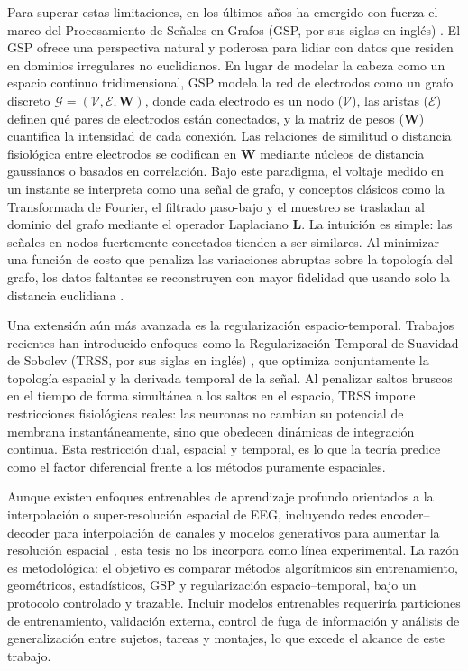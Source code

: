 Para superar estas limitaciones, en los últimos años ha emergido con fuerza el marco del Procesamiento de Señales en Grafos (GSP, por sus siglas en inglés) \cite{shuman2013,ortega2018}. El GSP ofrece una perspectiva natural y poderosa para lidiar con datos que residen en dominios irregulares no euclidianos. En lugar de modelar la cabeza como un espacio continuo tridimensional, GSP modela la red de electrodos como un grafo discreto $\mathcal{G} = (\mathcal{V}, \mathcal{E}, \mathbf{W})$, donde cada electrodo es un nodo ($\mathcal{V}$), las aristas ($\mathcal{E}$) definen qué pares de electrodos están conectados, y la matriz de pesos ($\mathbf{W}$) cuantifica la intensidad de cada conexión. Las relaciones de similitud o distancia fisiológica entre electrodos se codifican en $\mathbf{W}$ mediante núcleos de distancia gaussianos o basados en correlación.
Bajo este paradigma, el voltaje medido en un instante se interpreta como una señal de grafo, y conceptos clásicos como la Transformada de Fourier, el filtrado paso-bajo y el muestreo se trasladan al dominio del grafo mediante el operador Laplaciano $\mathbf{L}$. La intuición es simple: las señales en nodos fuertemente conectados tienden a ser similares. Al minimizar una función de costo que penaliza las variaciones abruptas sobre la topología del grafo, los datos faltantes se reconstruyen con mayor fidelidad que usando solo la distancia euclidiana \cite{narang2013}.

Una extensión aún más avanzada es la regularización espacio-temporal. Trabajos recientes han introducido enfoques como la Regularización Temporal de Suavidad de Sobolev (TRSS, por sus siglas en inglés) \cite{giraldo2022}, que optimiza conjuntamente la topología espacial y la derivada temporal de la señal. Al penalizar saltos bruscos en el tiempo de forma simultánea a los saltos en el espacio, TRSS impone restricciones fisiológicas reales: las neuronas no cambian su potencial de membrana instantáneamente, sino que obedecen dinámicas de integración continua. Esta restricción dual, espacial y temporal, es lo que la teoría predice como el factor diferencial frente a los métodos puramente espaciales.

Aunque existen enfoques entrenables de aprendizaje profundo orientados a la interpolación o super-resolución espacial de EEG, incluyendo redes encoder--decoder para interpolación de canales y modelos generativos para aumentar la resolución espacial \cite{sabaSadiya2020eeg_channel_interpolation,corley2018deep_eeg_super_resolution}, esta tesis no los incorpora como línea experimental. La razón es metodológica: el objetivo es comparar métodos algorítmicos sin entrenamiento, geométricos, estadísticos, GSP y regularización espacio--temporal, bajo un protocolo controlado y trazable. Incluir modelos entrenables requeriría particiones de entrenamiento, validación externa, control de fuga de información y análisis de generalización entre sujetos, tareas y montajes, lo que excede el alcance de este trabajo.
